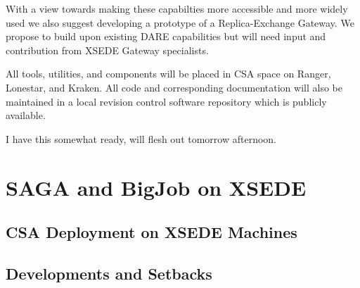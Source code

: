 \documentclass{sig-alternate}
\begin{document}
With a view towards making these capabilties more accessible  and more widely
used we also suggest developing a  prototype of a Replica-Exchange Gateway. We
propose to build upon existing DARE capabilities but will need input and
contribution from XSEDE  Gateway specialists.  

All tools, utilities, and components will be placed in CSA space on Ranger,
Lonestar, and Kraken. All code and corresponding documentation will also be
maintained in a local revision control software repository which is publicly
available.




I have this somewhat ready, will flesh out tomorrow
afternoon. 

\section{SAGA and BigJob on XSEDE}

\subsection{CSA Deployment on XSEDE Machines}


\subsection{Developments and Setbacks}


 
\end{document}
